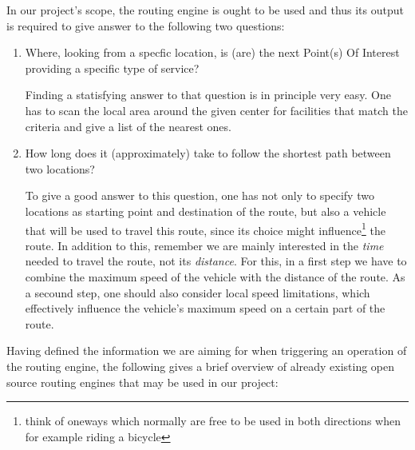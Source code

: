 In our project's scope, the routing engine is ought to be used and thus its output is required to give answer to the following two questions:

\begin{enumerate}

	\item Where, looking from a specfic location, is (are) the next Point(s) Of Interest providing a specific type of service?
	
		Finding a statisfying answer to that question is in principle very easy. One has to scan the local area around the given center for facilities that match the criteria and give a list of the nearest ones.
	
	\item How long does it (approximately) take to follow the shortest path between two locations?
	
		To give a good answer to this question, one has not only to specify two locations as starting point and destination of the route, but also a vehicle that will be used to travel this route, since its choice might influence\footnote{think of oneways which normally are free to be used in both directions when for example riding a bicycle} the route. In addition to this, remember we are mainly interested in the \emph{time} needed to travel the route, not its \emph{distance}. For this, in a first step we have to combine the maximum speed of the vehicle with the distance of the route. As a secound step, one should also consider local speed limitations, which effectively influence the vehicle's maximum speed on a certain part of the route.

\end{enumerate}

Having defined the information we are aiming for when triggering an operation of the routing engine, the following gives a brief overview of already existing open source routing engines that may be used in our project:

